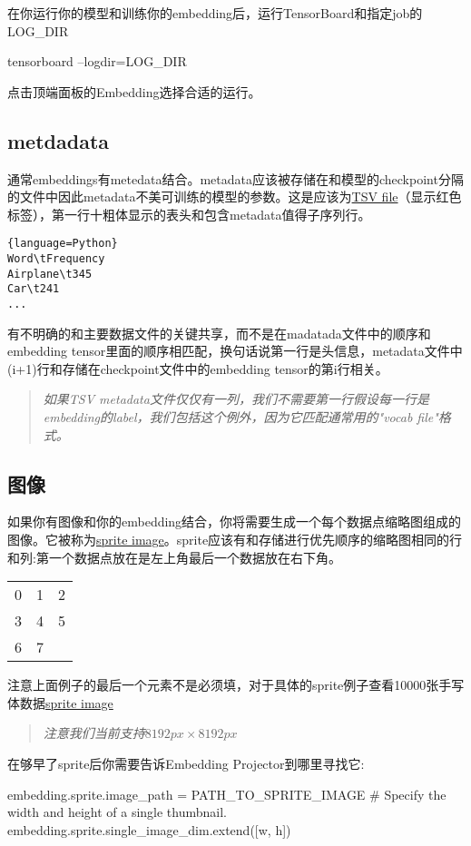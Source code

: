 在你运行你的模型和训练你的embedding后，运行TensorBoard和指定job的LOG\_DIR
\begin{python}
tensorboard --logdir=LOG_DIR
\end{python}
点击顶端面板的Embedding选择合适的运行。
\subsection{metdadata}
通常embeddings有metedata结合。metadata应该被存储在和模型的checkpoint分隔的文件中因此metadata不美可训练的模型的参数。这是应该为\href{https://en.wikipedia.org/wiki/Tab-separated_values}{TSV file}（显示红色标签），第一行十粗体显示的表头和包含metadata值得子序列行。
\begin{lstlisting}{language=Python}
Word\tFrequency
Airplane\t345
Car\t241
...
\end{lstlisting}
有不明确的和主要数据文件的关键共享，而不是在madatada文件中的顺序和embedding tensor里面的顺序相匹配，换句话说第一行是头信息，metadata文件中(i+1)行和存储在checkpoint文件中的embedding tensor的第i行相关。
\begin{quote}
	\emph{如果TSV metadata文件仅仅有一列，我们不需要第一行假设每一行是embedding的label，我们包括这个例外，因为它匹配通常用的"vocab file"格式。}
\end{quote}
\subsection{图像}
如果你有图像和你的embedding结合，你将需要生成一个每个数据点缩略图组成的图像。它被称为\href{https://www.google.com/webhp#q=what+is+a+sprite+image}{sprite image}。sprite应该有和存储进行优先顺序的缩略图相同的行和列:第一个数据点放在是左上角最后一个数据放在右下角。
\begin{tabular}{|c|c|c|}
	0&1&2\\
	3&4&5\\
	6&7&\\
\end{tabular}
注意上面例子的最后一个元素不是必须填，对于具体的sprite例子查看10000张手写体数据\href{https://www.tensorflow.org/images/mnist_10k_sprite.png}{sprite image}
\begin{quote}
	\emph{注意我们当前支持$8192px\times8192px$}
\end{quote}
在够早了sprite后你需要告诉Embedding Projector到哪里寻找它:
\begin{python}
embedding.sprite.image_path = PATH_TO_SPRITE_IMAGE
	# Specify the width and height of a single thumbnail.
	embedding.sprite.single_image_dim.extend([w, h])
\end{python}
